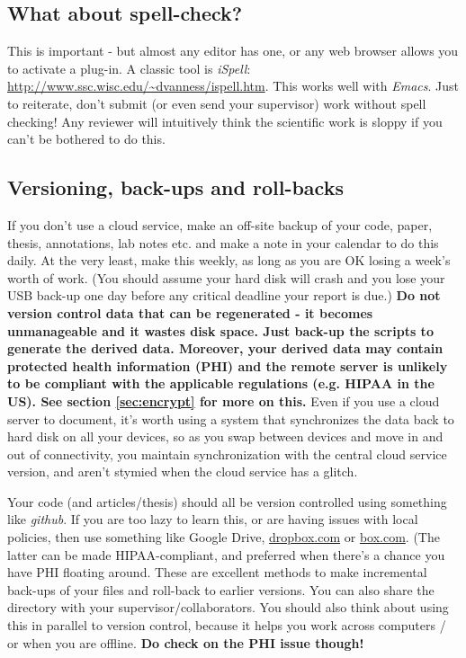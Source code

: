 \subsection{What about spell-check?}
This is important - but almost any editor has one, or any web browser allows you to activate a plug-in. 
A classic tool is {\it iSpell}: \newline
\url{http://www.ssc.wisc.edu/~dvanness/ispell.htm}. This works well with {\it Emacs}. Just to reiterate, don't submit (or even send your supervisor) work without spell checking! Any reviewer will intuitively think the scientific work is sloppy if you can't be bothered
to do this.

\subsection{Versioning, back-ups and roll-backs}
If you don't use a cloud service, make an off-site backup of your code, paper, thesis, annotations, lab notes etc. and make a note in your calendar to do this daily. At the very least, make this weekly, as long as you are OK losing a week's worth of work. (You should assume your hard disk will crash and you lose your USB back-up one day before any critical deadline your report is due.)
{\bf Do not version control data that can be regenerated - it becomes unmanageable and it wastes disk space. Just back-up the scripts to generate the derived data. Moreover, your derived data may contain protected health information (PHI) and the remote server is unlikely to be compliant with the applicable regulations (e.g. HIPAA in the US). See section \ref{sec:encrypt} for more on this.}
Even if you use a cloud server to document, it's worth using a system that synchronizes the data back to hard disk on all your devices, so as you swap between devices and move in and out of connectivity, you maintain synchronization with the central cloud service version, and aren't stymied when the cloud service has a glitch. 

Your code (and articles/thesis) should all be version controlled using something like {\it github}. 
If you are too lazy to learn this, or are having issues with local policies, then use something like Google Drive, \url{dropbox.com} or \url{box.com}. (The latter can be made HIPAA-compliant, and preferred when there's a chance you have PHI floating around. These are excellent methods to make incremental back-ups of your 
files and roll-back to earlier versions. You can also share the 
directory with your supervisor/collaborators. You should also think
about using this in parallel to version control, because it helps you
work across computers / or when you are offline. {\bf Do check on the 
PHI issue though!}

